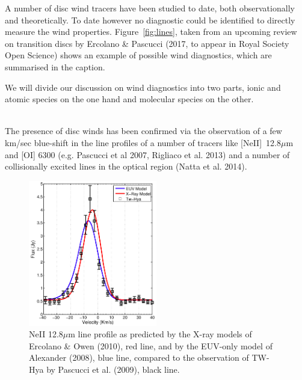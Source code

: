\documentclass[10pt,fleqn,twoside]{article}
\newcommand{\Tcol}{\color{blue}}
\begin{document}
A number of disc wind tracers have been studied to date, both
observationally and theoretically. To date however no diagnostic could
be identified to directly measure the wind properties. 
Figure~\ref{fig:lines}, taken from an upcoming review on transition discs by
Ercolano \& Pascucci (2017, to appear in Royal Society Open Science)
shows an example of possible wind diagnostics, which are summarised in
the caption.  

We will divide our discussion on wind diagnostics into two parts,
ionic and atomic species on the one hand and molecular species on the
other. 

\vspace{0.5em}{\Tcol\bf Ionic and atomic species}\\
The presence of disc winds has been confirmed via the
observation of a few km/sec blue-shift in the line profiles of a
number of tracers like [NeII]~12.8$\mu$m and [OI] 6300 (e.g. Pascucci
et al 2007, Rigliaco et al. 2013) and a number of collisionally excited lines in the optical
region (Natta et al. 2014). 

 \begin{figure}
   \centering
   \includegraphics[width=0.5\textwidth]{neii.jpg}
   \caption{NeII 12.8$\mu$m line profile as predicted by the X-ray
     models of Ercolano \& Owen (2010), red line, and  by the EUV-only
     model of Alexander (2008), blue line, compared to the observation
     of TW-Hya by Pascucci et al. (2009), black line.
}
              \label{fig:neii}%
    \end{figure}
\end{document}
